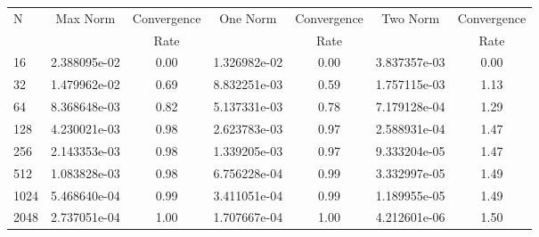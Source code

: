\documentclass[12pt]{article}
\begin{document}
	\begin{tabular}{l|c|c|c|c|c|c}
		N&Max Norm&Convergence&One Norm&Convergence&Two Norm&Convergence\\
		&&Rate&&Rate&&Rate\\
		\hline
		16&2.388095e-02&0.00&1.326982e-02&0.00&3.837357e-03&0.00\\
		\hline
		32&1.479962e-02&0.69&8.832251e-03&0.59&1.757115e-03&1.13\\
		\hline
		64&8.368648e-03&0.82&5.137331e-03&0.78&7.179128e-04&1.29\\
		\hline
		128&4.230021e-03&0.98&2.623783e-03&0.97&2.588931e-04&1.47\\
		\hline
		256&2.143353e-03&0.98&1.339205e-03&0.97&9.333204e-05&1.47\\
		\hline
		512&1.083828e-03&0.98&6.756228e-04&0.99&3.332997e-05&1.49\\
		\hline
		1024&5.468640e-04&0.99&3.411051e-04&0.99&1.189955e-05&1.49\\
		\hline
		2048&2.737051e-04&1.00&1.707667e-04&1.00&4.212601e-06&1.50\\
	\end{tabular}
\end{document}

